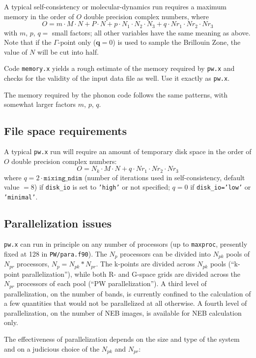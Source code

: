 \documentclass[12pt,a4paper]{article}
\begin{document}
A typical self-consistency or molecular-dynamics run requires 
a maximum memory in the order
of $O$ double precision complex numbers, where
$$
O = m \cdot M \cdot N + P \cdot N + p \cdot N_1 \cdot N_2 \cdot N_3
    + q \cdot Nr_1 \cdot Nr_2 \cdot Nr_3
$$
with $m$, $p$, $q=$ small factors; all other variables have the same
meaning as above.
Note that if the $\Gamma$-point only ($\mathbf{q}=0$) is used to
sample the Brillouin Zone, the value of $N$ will be cut into half.

Code \texttt{memory.x} yields a rough estimate of the memory required 
by \texttt{pw.x} and checks for the validity of the input data file as 
well. Use it exactly as \texttt{pw.x}.

The memory required by the phonon code follows the same patterns,
with somewhat larger factors $m$, $p$, $q$.

\subsection{File space requirements}

A typical \texttt{pw.x} run will require an amount of temporary disk
space in the order of $O$ double precision complex numbers:
$$
O = N_k \cdot M \cdot N + q \cdot Nr_1 \cdot Nr_2 \cdot Nr_3
$$
where $q=2 \cdot \mathtt{mixing\_ndim}$ (number of iterations used in
self-consistency, default value $=8$) if \texttt{disk\_io} is set to
\texttt{'high'} or not specified;
$q=0$ if \texttt{disk\_io='low'} or \texttt{'minimal'}.

\subsection{Parallelization issues}
  \label{parissues}

\texttt{pw.x} can run in principle on any number of processors (up to
\texttt{maxproc}, presently fixed at 128 in \texttt{PW/para.f90}). 
The $N_p$ processors can be divided into $N_{pk}$ pools of $N_{pr}$
processors, $N_p=N_{pk}*N_{pr}$. 
The k-points are divided across $N_{pk}$ pools (``k-point
parallelization''), while both R- and G-space grids are divided across
the $N_{pr}$ processors of each pool (``PW parallelization'').
A third level of parallelization, on the number of bands, is 
currently confined to the calculation of a few quantities that 
would not be parallelized at all otherwise.
A fourth level of parallelization, on the number of NEB images,
is available for NEB calculation only.

The effectiveness of parallelization depends on the size and type of
the system and on a judicious choice of the $N_{pk}$ and $N_{pr}$:
\end{document}
